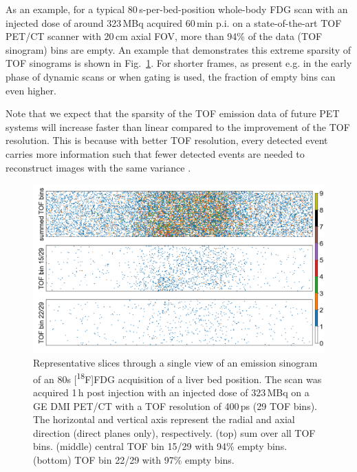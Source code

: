 As an example, for a typical 80\,s-per-bed-position whole-body FDG scan with an injected dose 
of around 323\,MBq acquired 60\,min p.i. on a state-of-the-art TOF PET/CT scanner with
20\,cm axial FOV, more than 94\% of the data (TOF sinogram) bins are empty.
An example that demonstrates this extreme sparsity of TOF sinograms is shown in Fig.~\ref{fig:sparsity}.
For shorter frames, as present e.g. in the early phase of dynamic scans or when gating is used, 
the fraction of empty bins can even higher.

Note that we expect that the sparsity of the TOF emission data of future PET systems will increase 
faster than linear compared to the improvement of the TOF resolution.
This is because with better TOF resolution, every detected event carries more information such
that fewer detected events are needed to reconstruct images with the same variance \cite{Tomitani1981}.

\begin{figure}
  \centering
    \includegraphics[width=1.0\columnwidth]{./figs/sparsity.png}
  \caption{Representative slices through a single view of an emission sinogram of an 
  80s [\textsuperscript{18}F]FDG acquisition of a liver bed position. 
  The scan was acquired 1\,h post injection with an injected dose of 323\,MBq on
  a GE DMI PET/CT with a TOF resolution of 400\,ps (29 TOF bins). 
  The horizontal and vertical axis represent the radial and axial direction (direct planes only), 
  respectively. 
  (top) sum over all TOF bins. (middle) central TOF bin 15/29 with 94\% empty bins. 
  (bottom) TOF bin 22/29 with 97\% empty bins.}

  \label{fig:sparsity}
\end{figure}


